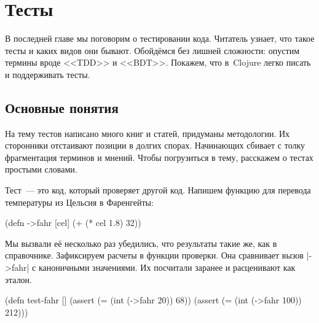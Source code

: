 \chapter{Тесты}


\label{chapter-tests}

\begin{teaser}
В последней главе мы поговорим о тестировании кода. Читатель узнает, что такое
тесты и каких видов они бывают. Обойд\"{е}мся без лишней сложности: опустим
термины вроде <<TDD>> и <<BDT>>. Покажем, что в~Clojure легко писать и
поддерживать тесты.
\end{teaser}

\section{Основные понятия}

На тему тестов написано много книг и статей, придуманы методологии. Их
сторонники отстаивают позиции в долгих спорах. Начинающих сбивает с толку
фрагментация терминов и мнений. Чтобы погрузиться в тему, расскажем о тестах
простыми словами.


Тест~--- это код, который проверяет другой код. Напишем функцию для перевода
температуры из Цельсия в Фаренгейты:

\begin{english}
  \begin{clojure}
(defn ->fahr [cel]
  (+ (* cel 1.8) 32))
  \end{clojure}
\end{english}


Мы вызвали е\"{е} несколько раз убедились, что результаты такие же, как в
справочнике. Зафиксируем расчеты в функции проверки. Она сравнивает вызов
\spverb|->fahr| с каноничными значениями. Их посчитали заранее и расценивают как
эталон.

\begin{english}
  \begin{clojure}
(defn test-fahr []
  (assert (= (int (->fahr 20)) 68))
  (assert (= (int (->fahr 100)) 212)))
  \end{clojure}
\end{english}


